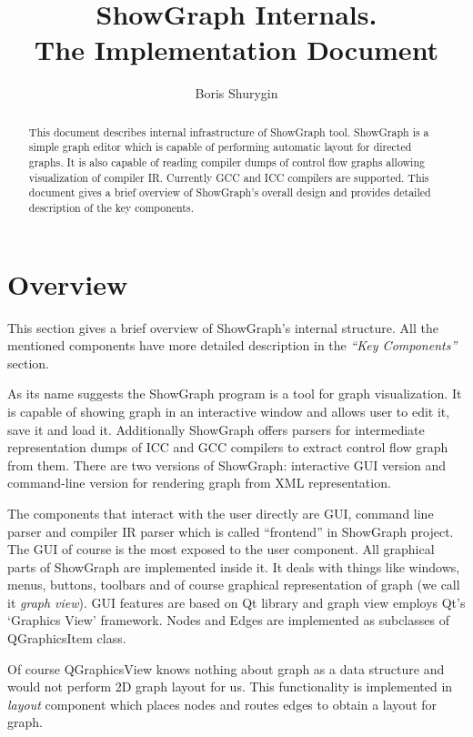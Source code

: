 \documentclass[11pt,a4paper]{article}
\begin{document}
 
\lstset{language=[Visual]C++}

\title{ShowGraph Internals.\\ \textsf{The Implementation Document}}
\author{Boris Shurygin}

\maketitle
\begin{abstract}
This document describes internal infrastructure of ShowGraph tool. ShowGraph is a simple graph editor which is capable of performing automatic layout for directed graphs. It is also capable of reading compiler dumps of control flow graphs allowing visualization of compiler IR. Currently GCC and ICC compilers are supported. This document gives a brief overview of ShowGraph's overall design and provides detailed description of the key components.
\end{abstract}
\tableofcontents
\section{Overview}
This section gives a brief overview of ShowGraph's internal structure. All the mentioned components have more detailed description in the \emph{``Key Components''} section.

As its name suggests the ShowGraph program is a tool for graph visualization. It is capable of showing graph in an interactive window and allows user to edit it, save it and load it. Additionally ShowGraph offers parsers for intermediate representation dumps of ICC and GCC compilers to extract control flow graph from them. There are two versions of ShowGraph: interactive GUI version and command-line version for rendering graph from XML representation.

The components that interact with the user directly are GUI, command line parser and compiler IR parser which is called ``frontend'' in ShowGraph project. The GUI of course is the most exposed to the user component. All graphical parts of ShowGraph are implemented inside it. It deals with things like windows, menus, buttons, toolbars and of course graphical representation of graph (we call it \emph{graph view}). GUI features are based on Qt library and graph view employs Qt's `Graphics View' framework. Nodes and Edges are implemented as subclasses of QGraphicsItem class.

Of course QGraphicsView knows nothing about graph as a data structure and would not perform 2D graph layout for us. This functionality is implemented in \emph{layout} component which places nodes and routes edges to obtain a layout for graph.
\end{document}
